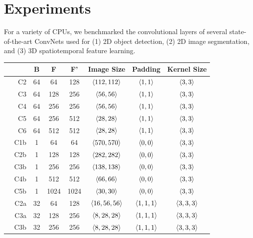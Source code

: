 \section{Experiments}

  For a variety of CPUs, we benchmarked the convolutional layers of
  several state-of-the-art ConvNets used for (1) 2D object detection,
  (2) 2D image segmentation, and (3) 3D spatiotemporal feature
  learning.

  \begin{table} \centering
    \setlength\tabcolsep{2.5pt}
    \begin{tabular}{cr !{\vrule width0.8pt} cccccc  }
      &  & B & F & F' & Image Size & Padding & Kernel Size  \\
      \hline
      & C2 & 64  & 64  &  128 & $\langle112,112\rangle$ & $\langle1,1\rangle$ & $\langle3,3\rangle$ \\
      & C3 & 64  & 128 &  256 & $\langle56,56\rangle$   & $\langle1,1\rangle$ & $\langle3,3\rangle$ \\
      & C4 & 64  & 256 &  256 & $\langle56,56\rangle$   & $\langle1,1\rangle$ & $\langle3,3\rangle$ \\
      & C5 & 64  & 256 &  512 & $\langle28,28\rangle$   & $\langle1,1\rangle$ & $\langle3,3\rangle$ \\
      & C6 & 64  & 512 &  512 & $\langle28,28\rangle$   & $\langle1,1\rangle$ & $\langle3,3\rangle$ \\
      \hline
      & C1b & 1  & 64  &  64 & $\langle570,570\rangle$  & $\langle0,0\rangle$ & $\langle3,3\rangle$ \\
      & C2b & 1  & 128 &  128 & $\langle282,282\rangle$ & $\langle0,0\rangle$ & $\langle3,3\rangle$ \\
      & C3b & 1  & 256 &  256 & $\langle138,138\rangle$ & $\langle0,0\rangle$ & $\langle3,3\rangle$ \\
      & C4b & 1  & 512 &  512 & $\langle66,66\rangle$   & $\langle0,0\rangle$ & $\langle3,3\rangle$ \\
      & C5b & 1  & 1024 &  1024 & $\langle30,30\rangle$ & $\langle0,0\rangle$ & $\langle3,3\rangle$ \\
      \hline
      & C2a & 32  & 64  &  128 & $\langle16,56,56\rangle$ & $\langle1,1,1\rangle$ & $\langle3,3,3\rangle$ \\
      & C3a & 32  & 128 &  256 & $\langle8,28,28\rangle$ & $\langle1,1,1\rangle$ & $\langle3,3,3\rangle$ \\
      & C3b & 32  & 256 &  256 & $\langle8,28,28\rangle$ & $\langle1,1,1\rangle$ & $\langle3,3,3\rangle$ \\

\end{tabular}
\end{table}
